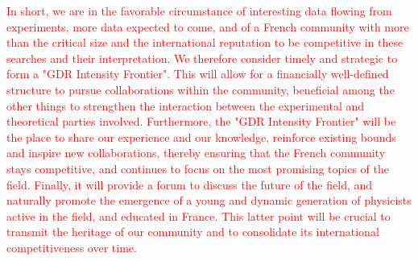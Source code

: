 \textcolor{red}{In short, we are in the favorable circumstance of interesting data flowing from experiments, more data expected to come, and of a French community with more than the critical size and the international reputation to be competitive in these searches and their interpretation. We therefore consider timely and strategic to form a "GDR Intensity Frontier". This  will allow for a financially well-defined structure to pursue collaborations within the community, beneficial among the other things to strengthen the interaction between the experimental and theoretical parties involved. Furthermore, the "GDR Intensity Frontier" will be the place to share our experience and our knowledge, reinforce existing bounds and inspire new collaborations, thereby ensuring that the French community stays competitive, and continues to focus on the most promising topics of the field. Finally, it will provide a forum to discuss the future of the field, and naturally promote the emergence of a young and dynamic generation of physicists active in the field, and educated in France. This latter point will be crucial to transmit the heritage of our community and to consolidate its international competitiveness over time.}
